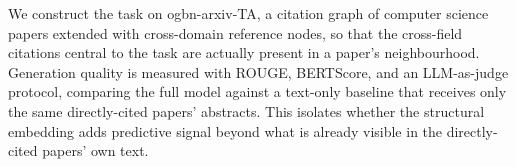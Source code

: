 \documentclass[12pt]{article}
\begin{document}
We construct the task on ogbn-arxiv-TA, a citation graph of computer
science papers extended with cross-domain reference nodes, so that
the cross-field citations central to the task are actually present
in a paper's neighbourhood. Generation quality is measured with
ROUGE,  BERTScore, and an LLM-as-judge protocol, comparing
the full model against a text-only baseline that
receives only the same directly-cited papers' abstracts. This
isolates whether the structural embedding adds predictive signal
beyond what is already visible in the directly-cited papers' own
text.

\vspace{1em}
\end{document}
